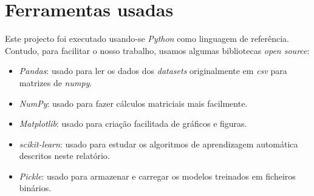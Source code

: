 \section{Ferramentas usadas}
Este projecto foi executado usando-se \textit{Python} como linguagem de referência. Contudo, para facilitar o nosso trabalho, usamos algumas bibliotecas \textit{open source}:
\begin{itemize}
\item \textit{Pandas}: usado para ler os dados dos \textit{datasets} originalmente em \textit{csv} para matrizes de \textit{numpy}.
\item \textit{NumPy}: usado para fazer cálculos matriciais mais facilmente.
\item \textit{Matplotlib}: usado para criação facilitada de gráficos e figuras.
\item \textit{scikit-learn}: usado para estudar os algoritmos de aprendizagem automática descritos neste relatório.
\item \textit{Pickle}: usado para armazenar e carregar os modelos treinados em ficheiros binários.
\end{itemize}

